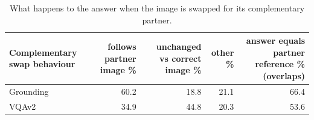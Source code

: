 \begin{table}[t]
\centering\small
\begin{tabular}{lrrrr}
\toprule
Complementary swap behaviour & follows partner image \% & unchanged vs correct image \% & other \% & answer equals partner reference \% (overlaps) \\
\midrule
Grounding & 60.2 & 18.8 & 21.1 & 66.4 \\
VQAv2 & 34.9 & 44.8 & 20.3 & 53.6 \\
\bottomrule
\end{tabular}
\caption{What happens to the answer when the image is swapped for its complementary partner.}
\label{tab:task2_swap_behavior}
\end{table}
